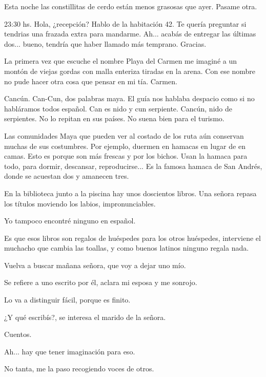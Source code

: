 \documentclass[11pt,twoside,openright,a6paper]{book}
\begin{document}
\vspace{1.5cm}
Esta noche las constillitas de cerdo están menos grasosas que ayer. Pasame otra.


\vspace{1.5cm}
23:30 hs. Hola, ¿recepción? Hablo de la habitación 42. Te quería preguntar si tendrias una frazada extra para mandarme. Ah... acabás de entregar las últimas dos... bueno, tendría que haber llamado más temprano. Gracias.


\vspace{1.5cm}
La primera vez que escuche el nombre Playa del Carmen me imaginé a un montón de viejas gordas con malla enteriza tiradas en la arena. Con ese nombre no pude hacer otra cosa que pensar en mi tía. Carmen.


\vspace{1.5cm}
Cancún. Can-Cun, dos palabras maya. El guía nos hablaba despacio como si no habláramos todos español. Can es nido y cun serpiente. Cancún, nido de serpientes. No lo repitan en sus países. No suena bien para el turismo.


\vspace{1.5cm}
Las comunidades Maya que pueden ver al costado de los ruta aún conservan muchas de sus costumbres. Por ejemplo, duermen en hamacas en lugar de en camas. Esto es porque son más frescas y por los bichos. Usan la hamaca para todo, para dormir, descansar, reproducirse... Es la famosa hamaca de San Andrés, donde se acuestan dos y amanecen tres.


\vspace{1.5cm}
En la biblioteca junto a la piscina hay unos doscientos libros.
Una señora repasa los títulos moviendo los labios, impronunciables.

Yo tampoco encontré ninguno en español.

Es que esos libros son regalos de huéspedes para los otros huéspedes, interviene el muchacho que cambia las toallas, y como buenos latinos ninguno regala nada.

Vuelva a buscar mañana señora, que voy a dejar uno mío.

Se refiere a uno escrito por él, aclara mi esposa y me sonrojo.

Lo va a distinguir fácil, porque es finito.

¿Y qué escribís?, se interesa el marido de la señora.

Cuentos.

Ah... hay que tener imaginación para eso.

No tanta, me la paso recogiendo voces de otros.
\end{document}
